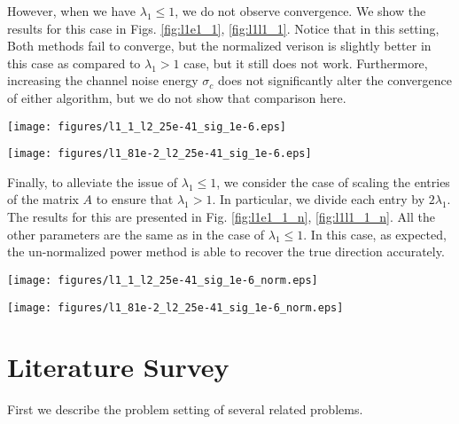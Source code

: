 \documentclass[10pt]{article}
\begin{document}
However, when we have $\lambda_1 \leq 1$, we do not observe convergence. We show the results for this case in Figs. \ref{fig:l1e1_1}, \ref{fig:l1l1_1}. Notice that in this setting, Both methods fail to converge, but the normalized verison is slightly better in this case as compared to $\lambda_1 > 1$ case, but it still does not work. Furthermore, increasing the channel noise energy $\sigma_c$ does not significantly alter the convergence of either algorithm, but we do not show that comparison here. 

\begin{minipage}[t]{.5\linewidth}
\centering
\texttt{[image: figures/l1\_1\_l2\_25e-41\_sig\_1e-6.eps]}
\label{fig:l1e1_1}
\end{minipage}%
\begin{minipage}[t]{.5\linewidth}
\centering
\texttt{[image: figures/l1\_81e-2\_l2\_25e-41\_sig\_1e-6.eps]}
\label{fig:l1l1_1}
\end{minipage}

Finally, to alleviate the issue of $\lambda_1 \leq 1$, we consider the case of scaling the entries of the matrix $A$ to ensure that $\lambda_1 > 1$. In particular, we divide each entry by $2\lambda_1$. The results for this are presented in Fig. \ref{fig:l1e1_1_n}, \ref{fig:l1l1_1_n}. All the other parameters are the same as in the case of $\lambda_1 \leq 1$. In this case, as expected, the un-normalized power method is able to recover the true direction accurately. 

\begin{minipage}[t]{.5\linewidth}
\centering
\texttt{[image: figures/l1\_1\_l2\_25e-41\_sig\_1e-6\_norm.eps]}
\label{fig:l1e1_1_n}
\end{minipage}%
\begin{minipage}[t]{.5\linewidth}
\centering
\texttt{[image: figures/l1\_81e-2\_l2\_25e-41\_sig\_1e-6\_norm.eps]}
\label{fig:l1l1_1_n}
\end{minipage}

\section{Literature Survey}
First we describe the problem setting of several related problems. 
\end{document}
